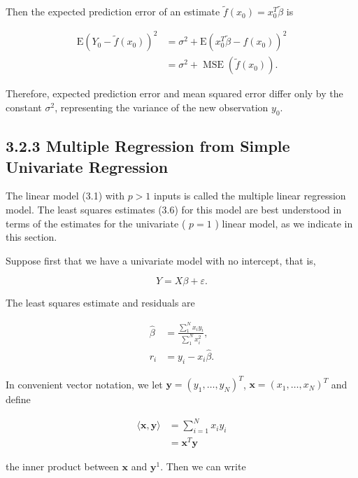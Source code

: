 \documentclass[10pt]{article}
\begin{document}
Then the expected prediction error of an estimate $\tilde{f}\left(x_{0}\right)=x_{0}^{T} \tilde{\beta}$ is


\begin{align*}
\mathrm{E}\left(Y_{0}-\tilde{f}\left(x_{0}\right)\right)^{2} & =\sigma^{2}+\mathrm{E}\left(x_{0}^{T} \tilde{\beta}-f\left(x_{0}\right)\right)^{2} \\
& =\sigma^{2}+\operatorname{MSE}\left(\tilde{f}\left(x_{0}\right)\right) . \tag{3.22}
\end{align*}


Therefore, expected prediction error and mean squared error differ only by the constant $\sigma^{2}$, representing the variance of the new observation $y_{0}$.

\subsection*{3.2.3 Multiple Regression from Simple Univariate Regression}
The linear model (3.1) with $p>1$ inputs is called the multiple linear regression model. The least squares estimates (3.6) for this model are best understood in terms of the estimates for the univariate ( $p=1$ ) linear model, as we indicate in this section.

Suppose first that we have a univariate model with no intercept, that is,


\begin{equation*}
Y=X \beta+\varepsilon . \tag{3.23}
\end{equation*}


The least squares estimate and residuals are


\begin{align*}
\hat{\beta} & =\frac{\sum_{1}^{N} x_{i} y_{i}}{\sum_{1}^{N} x_{i}^{2}},  \tag{3.24}\\
r_{i} & =y_{i}-x_{i} \hat{\beta} .
\end{align*}


In convenient vector notation, we let $\mathbf{y}=\left(y_{1}, \ldots, y_{N}\right)^{T}$, $\mathbf{x}=\left(x_{1}, \ldots, x_{N}\right)^{T}$ and define


\begin{align*}
\langle\mathbf{x}, \mathbf{y}\rangle & =\sum_{i=1}^{N} x_{i} y_{i} \\
& =\mathbf{x}^{T} \mathbf{y} \tag{3.25}
\end{align*}


the inner product between $\mathbf{x}$ and $\mathbf{y}^{1}$. Then we can write
\end{document}
